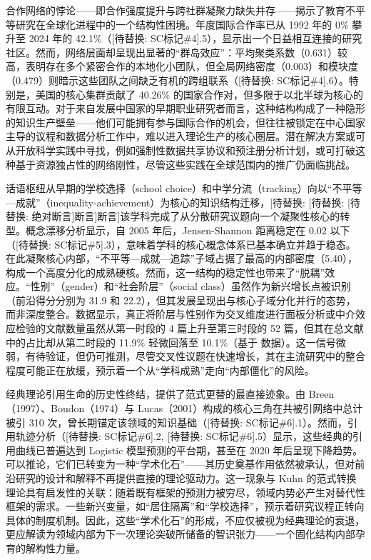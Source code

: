 \documentclass[12pt,a4paper]{article}
\begin{document}
合作网络的悖论——即合作强度提升与跨社群凝聚力缺失并存——揭示了教育不平等研究在全球化进程中的一个结构性困境。年度国际合作率已从 1992 年的 0\% 攀升至 2024 年的 42.1\%（[待替换: SC标记\#4].5），显示出一个日益相互连接的研究社区。然而，网络层面却呈现出显著的“群岛效应”：平均聚类系数（0.631）较高，表明存在多个紧密合作的本地化小团队，但全局网络密度（0.003）和模块度（0.479）则暗示这些团队之间缺乏有机的跨组联系（[待替换: SC标记\#4].6）。特别是，美国的核心集群贡献了 40.26\% 的国家合作对，但多限于以北半球为核心的有限互动。对于来自发展中国家的早期职业研究者而言，这种结构构成了一种隐形的知识生产壁垒——他们可能拥有参与国际合作的机会，但往往被锁定在中心国家主导的议程和数据分析工作中，难以进入理论生产的核心圈层。潜在解决方案或可从开放科学实践中寻找，例如强制性数据共享协议和预注册分析计划，或可打破这种基于资源独占性的网络刚性，尽管这些实践在全球范围内的推广仍面临挑战。

话语枢纽从早期的学校选择（school choice）和中学分流（tracking）向以“不平等—成就”（inequality-achievement）为核心的知识结构迁移，[待替换: [待替换: [待替换: 绝对断言]断言]断言]该学科完成了从分散研究议题向一个凝聚性核心的转型。概念漂移分析显示，自 2005 年后，Jensen-Shannon 距离稳定在 0.02 以下（[待替换: SC标记\#5].3），意味着学科的核心概念体系已基本确立并趋于稳态。在此凝聚核心内部，“不平等—成就—追踪”子域占据了最高的内部密度（5.40），构成一个高度分化的成熟硬核。然而，这一结构的稳定性也带来了“脱耦”效应。“性别”（gender）和“社会阶层”（social class）虽然作为新兴增长点被识别（前沿得分分别为 31.9 和 22.2），但其发展呈现出与核心子域分化并行的态势，而非深度整合。数据显示，真正将阶层与性别作为交叉维度进行面板分析或中介效应检验的文献数量虽然从第一时段的 4 篇上升至第三时段的 52 篇，但其在总文献中的占比却从第二时段的 11.9\% 轻微回落至 10.1\%（基于  数据）。这一信号微弱，有待验证，但仍可推测，尽管交叉性议题在快速增长，其在主流研究中的整合程度可能正在放缓，预示着一个从“学科成熟”走向“内部僵化”的风险。

经典理论引用生命的历史性终结，提供了范式更替的最直接迹象。由 Breen（1997）、Boudon（1974）与 Lucas（2001）构成的核心三角在共被引网络中总计被引 310 次，曾长期锚定该领域的知识基础（[待替换: SC标记\#6].1）。然而，引用轨迹分析（[待替换: SC标记\#6].2, [待替换: SC标记\#6].5）显示，这些经典的引用曲线已普遍达到 Logistic 模型预测的平台期，甚至在 2020 年后呈现下降趋势。可以推论，它们已转变为一种“学术化石”——其历史奠基作用依然被承认，但对前沿研究的设计和解释不再提供直接的理论驱动力。这一现象与 Kuhn 的范式转换理论具有启发性的关联：随着既有框架的预测力被穷尽，领域内势必产生对替代性框架的需求。一些新兴变量，如“居住隔离”和“学校选择”，预示着研究议程正转向具体的制度机制。因此，这些“学术化石”的形成，不应仅被视为经典理论的衰退，更应解读为领域内部为下一次理论突破所储备的智识张力——一个固化结构内部孕育的解构性力量。
\end{document}
